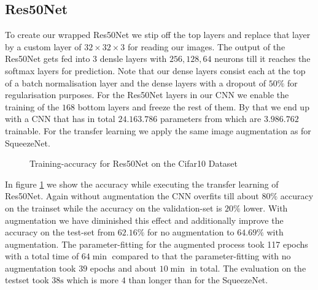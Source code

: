 \documentclass[11pt]{article}
\begin{document}
\subsection{Res50Net}
To create our wrapped Res50Net we stip off the top layers and replace that layer by a custom layer of $32\times 32 \times 3$ for reading our images. The output of the Res50Net gets fed into $3$ densle layers with $256, 128, 64$ neurons till it reaches the softmax layers for prediction. Note that our dense layers consist each at the top of a batch normalisation layer and the dense layers with a dropout of $50\%$ for regularisation purposes. For the Res50Net layers in our CNN we enable the training of the $168$ bottom layers and freeze the rest of them. By that we end up with a CNN that has in total $24.163.786$ parameters from which are $3.986.762$ trainable. For the transfer learning we apply the same image augmentation as for SqueezeNet.

\begin{figure}
\centering
{}
  \hfill
  \hfill
\caption{Training-accuracy for Res50Net on the Cifar10 Dataset}
\label{rescnn::3}
\end{figure}

In figure \ref{rescnn::3} we show the accuracy while executing the transfer learning of Res50Net. Again without augmentation the CNN overfits till about $80\%$ accuracy on the trainset while the accuracy on the validation-set is $20\%$ lower. With augmentation we have diminished this effect and additionally improve the accuracy on the test-set from $62.16\%$ for no augmentation to $64.69\%$ with augmentation. The parameter-fitting for the augmented process took 117 epochs with a total time of $64 \min$ compared to that the parameter-fitting with no augmentation took $39$ epochs and about $10 \min$ in total. The evaluation on the testset took $38\text{s}$ which is more $4$ than longer than for the SqueezeNet.
\end{document}
